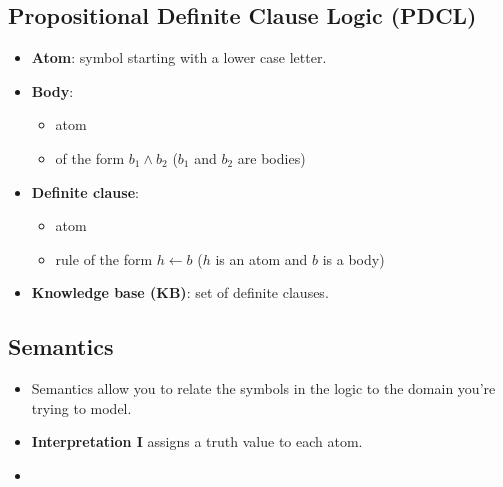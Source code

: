 \documentclass{article}
\begin{document}
\subsection{Propositional Definite Clause Logic (PDCL)}

\begin{itemize}
    \item \textbf{Atom}: symbol starting with a lower case letter.
    \item \textbf{Body}: 
        \begin{itemize}
            \item atom
            \item of the form $b_1 \wedge b_2$ ($b_1$ and $b_2$ are bodies)
        \end{itemize}
    \item \textbf{Definite clause}:
        \begin{itemize}
            \item atom
            \item rule of the form $h \leftarrow b$ ($h$ is an atom and $b$ is a body)
        \end{itemize}
    \item \textbf{Knowledge base (KB)}: set of definite clauses.
\end{itemize}

\subsection{Semantics}

\begin{itemize}
    \item Semantics allow you to relate the symbols in the logic to the domain you're trying to model.
    \item \textbf{Interpretation I} assigns a truth value to each atom.
    \item 
\end{itemize}
\end{document}

